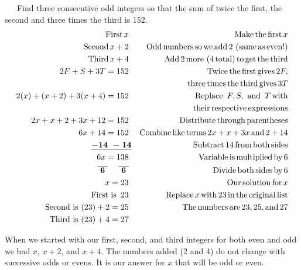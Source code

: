 \begin{example}\label{Lin78}~~~Find three consecutive odd integers so that the sum of twice the first, the
  second and three times the third is 152.
  \begin{eqnarray*}
    \operatorname{First} x~ &  & \operatorname{Make} \operatorname{the} \operatorname{first} x\\
    \operatorname{Second} x + 2~ &  & \operatorname{Odd} \operatorname{numbers} \operatorname{so} \operatorname{we}
    \operatorname{add} 2~ (\operatorname{same} \operatorname{as} \operatorname{even} !)\\
    \operatorname{Third} x + 4~ &  & \operatorname{Add} 2 \operatorname{more}~ (4 \operatorname{total})
    \operatorname{to} \operatorname{get} \operatorname{the} \operatorname{third}\\
    2 F + S + 3 T = 152~ &  & \operatorname{Twice} \operatorname{the} \operatorname{first} \operatorname{gives}
    2 F,\\
		& & ~~~\operatorname{three} \operatorname{times} \operatorname{the} \operatorname{third}
    \operatorname{gives} 3 T\\
    2 (x) + (x + 2) + 3 (x + 4) = 152~ &  & \operatorname{Replace~} F, S, \operatorname{~and~} T
    \operatorname{with}\\
		& & \operatorname{their} \operatorname{respective} \operatorname{expressions}\\
    2 x + x + 2 + 3 x + 12 = 152~ &  & \operatorname{Distribute} \operatorname{through}
    \operatorname{parentheses}\\
    6 x + 14 = 152~ &  & \operatorname{Combine} \operatorname{like} \operatorname{terms} 2 x + x + 3 x
    \operatorname{and} 2 + 14\\
    \boldsymbol{\underline{- 14 ~- 14}} &  & \operatorname{Subtract} 14 \operatorname{from}
    \operatorname{both} \operatorname{sides}\\
    6 x = 138~ &  & \operatorname{Variable} \operatorname{is} \operatorname{multiplied} \operatorname{by} 6\\
    \boldsymbol{\overline{~6~} ~~~~ \overline{~6~}}~ &  & \operatorname{Divide} \operatorname{both}
    \operatorname{sides} \operatorname{by} 6\\
    x = 23~ &  & \operatorname{Our} \operatorname{solution} \operatorname{for} x\\
    \operatorname{First~is~} 23~ &  & \operatorname{Replace} x \operatorname{with} 23 \operatorname{in} \operatorname{the}
    \operatorname{original} \operatorname{list}\\
    \operatorname{Second~is~} (23) + 2 = 25~ &  & \operatorname{The} \operatorname{numbers} \operatorname{are} 23,
    25, \operatorname{and} 27\\
    \operatorname{Third~is~} (23) + 4 = 27~ &  & 
  \end{eqnarray*}
\end{example}

 When we started with our first, second, and third integers for both even and
odd we had $x$, $x + 2$, and $x + 4$. The numbers added (2 and 4) do not change with successive odds
or evens.  It is our answer for $x$ that will be odd or even.\pp


